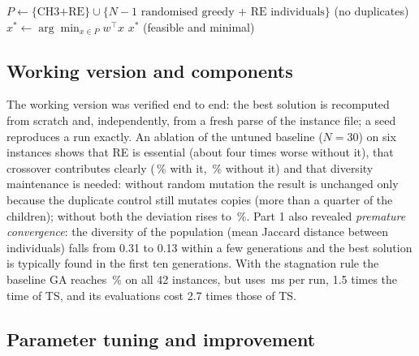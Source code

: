 \documentclass[11pt,a4paper]{article}
\begin{document}
\begin{algorithm}[t]
\caption{Genetic algorithm for the SCP (one run)}\label{alg:ga}
\DontPrintSemicolon
{}
$P \leftarrow \{\text{CH3+RE}\}\cup\{N-1 \text{ randomised greedy + RE individuals}\}$ (no duplicates)\;
$x^* \leftarrow \arg\min_{x\in P} w^\top x$\;
\Return $x^*$ (feasible and minimal)
\end{algorithm}

\subsection{Working version and components}
The working version was verified end to end: the best solution is recomputed from scratch and, independently, from a fresh parse of the instance file; a seed reproduces a run exactly.
An ablation of the untuned baseline ($N=30$) on six instances shows that RE is essential (about four times worse without it), that crossover contributes clearly (\ablBase\,\% with it, \ablNoCross\,\% without it) and that diversity maintenance is needed: without random mutation the result is unchanged only because the duplicate control still mutates copies (more than a quarter of the children); without both the deviation rises to \ablNoMutNoDup\,\%.
Part 1 also revealed \emph{premature convergence}: the diversity of the population (mean Jaccard distance between individuals) falls from 0.31 to 0.13 within a few generations and the best solution is typically found in the first ten generations.
With the stagnation rule the baseline GA reaches \devGAbase\,\% on all 42 instances, but uses \cpuGAbase\,ms per run, 1.5 times the time of TS, and its evaluations cost 2.7 times those of TS.

\subsection{Parameter tuning and improvement}
\end{document}
